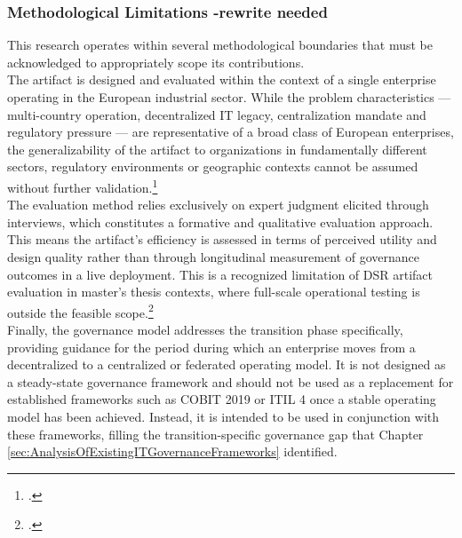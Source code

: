 \subsubsection{Methodological Limitations -rewrite needed}
\label{subsubsec:MethodologicalLimitations}
This research operates within several methodological boundaries that must be acknowledged to appropriately scope its contributions.
\\
The artifact is designed and evaluated within the context of a single enterprise operating in the European industrial sector.
While the problem characteristics — multi-country operation, decentralized IT legacy, centralization mandate and regulatory pressure — are representative of a broad class of European enterprises, the generalizability of the artifact to organizations in fundamentally different sectors, regulatory environments or geographic contexts cannot be assumed without further validation.\footcite[87-88]{hevnerDesignScienceInformation2004}
\\
The evaluation method relies exclusively on expert judgment elicited through interviews, which constitutes a formative and qualitative evaluation approach.
This means the artifact's efficiency is assessed in terms of perceived utility and design quality rather than through longitudinal measurement of governance outcomes in a live deployment.
This is a recognized limitation of \ac{DSR} artifact evaluation in master's thesis contexts, where full-scale operational testing is outside the feasible scope.\footcite[3]{bennerwicknerLeitfadenNutzungDesign2020}
\\
Finally, the governance model addresses the transition phase specifically, providing guidance for the period during which an enterprise moves from a decentralized to a centralized or federated operating model.
It is not designed as a steady-state governance framework and should not be used as a replacement for established frameworks such as \ac{COBIT} 2019 or \ac{ITIL} 4 once a stable operating model has been achieved.
Instead, it is intended to be used in conjunction with these frameworks, filling the transition-specific governance gap that Chapter \ref{sec:AnalysisOfExistingITGovernanceFrameworks} identified.
